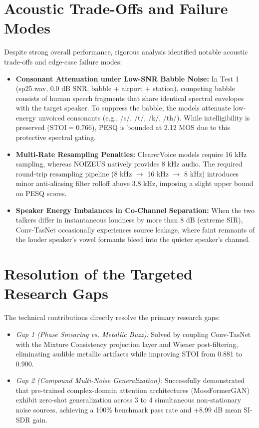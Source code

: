 \documentclass[11pt,a4paper]{report}
\begin{document}
\section{Acoustic Trade-Offs and Failure Modes}
Despite strong overall performance, rigorous analysis identified notable acoustic trade-offs and edge-case failure modes:
\begin{itemize}
    \item \textbf{Consonant Attenuation under Low-SNR Babble Noise:} In Test 1 (sp25.wav, 0.0 dB SNR, babble + airport + station), competing babble consists of human speech fragments that share identical spectral envelopes with the target speaker. To suppress the babble, the models attenuate low-energy unvoiced consonants (e.g., /s/, /t/, /k/, /th/). While intelligibility is preserved ($\text{STOI} = 0.766$), PESQ is bounded at 2.12 MOS due to this protective spectral gating.
    \item \textbf{Multi-Rate Resampling Penalties:} ClearerVoice models require 16 kHz sampling, whereas NOIZEUS natively provides 8 kHz audio. The required round-trip resampling pipeline (8 kHz $\rightarrow$ 16 kHz $\rightarrow$ 8 kHz) introduces minor anti-aliasing filter rolloff above 3.8 kHz, imposing a slight upper bound on PESQ scores.
    \item \textbf{Speaker Energy Imbalances in Co-Channel Separation:} When the two talkers differ in instantaneous loudness by more than 8 dB (extreme SIR), Conv-TasNet occasionally experiences source leakage, where faint remnants of the louder speaker's vowel formants bleed into the quieter speaker's channel.
\end{itemize}

\section{Resolution of the Targeted Research Gaps}
The technical contributions directly resolve the primary research gaps:
\begin{itemize}
    \item \textit{Gap 1 (Phase Smearing vs. Metallic Buzz):} Solved by coupling Conv-TasNet with the Mixture Consistency projection layer and Wiener post-filtering, eliminating audible metallic artifacts while improving STOI from 0.881 to 0.900.
    \item \textit{Gap 2 (Compound Multi-Noise Generalization):} Successfully demonstrated that pre-trained complex-domain attention architectures (MossFormerGAN) exhibit zero-shot generalization across 3 to 4 simultaneous non-stationary noise sources, achieving a 100\% benchmark pass rate and +8.99 dB mean SI-SDR gain.
\end{itemize}
\end{document}

